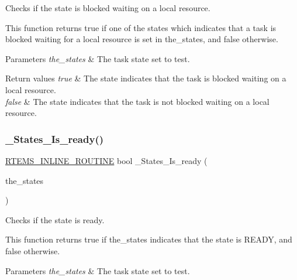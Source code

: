 Checks if the state is blocked waiting on a local resource. 

This function returns true if one of the states which indicates that a task is blocked waiting for a local resource is set in the\+\_\+states, and false otherwise.


\begin{DoxyParams}{Parameters}
{\em the\+\_\+states} & The task state set to test.\\
\hline
\end{DoxyParams}

\begin{DoxyRetVals}{Return values}
{\em true} & The state indicates that the task is blocked waiting on a local resource. \\
\hline
{\em false} & The state indicates that the task is not blocked waiting on a local resource. \\
\hline
\end{DoxyRetVals}
\mbox{\label{group__RTEMSScoreStates_ga15946028917e3bbb7ecce815aedf5d82}} 
\subsubsection{\texorpdfstring{\_States\_Is\_ready()}{\_States\_Is\_ready()}}
{\footnotesize\ttfamily \mbox{\hyperlink{group__RTEMSScoreBaseDefs_gac216239df231d5dbd15e3520b0b9313f}{R\+T\+E\+M\+S\+\_\+\+I\+N\+L\+I\+N\+E\+\_\+\+R\+O\+U\+T\+I\+NE}} bool \+\_\+\+States\+\_\+\+Is\+\_\+ready (\begin{DoxyParamCaption}\item[{\mbox{\hyperlink{group__RTEMSScoreStates_gaeebbea0bfca162709b124fd519cf99d3}{States\+\_\+\+Control}}}]{the\+\_\+states }\end{DoxyParamCaption})}



Checks if the state is ready. 

This function returns true if the\+\_\+states indicates that the state is R\+E\+A\+DY, and false otherwise.


\begin{DoxyParams}{Parameters}
{\em the\+\_\+states} & The task state set to test.\\
\hline
\end{DoxyParams}

